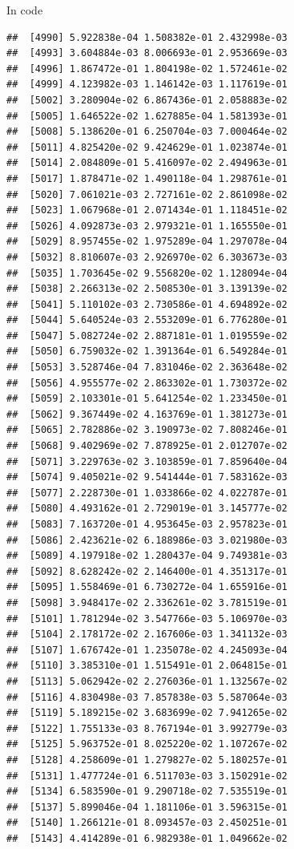 \documentclass[ignorenonframetext,]{beamer}
\begin{document}
\begin{frame}[fragile]{In code}
\begin{verbatim}
##  [4990] 5.922838e-04 1.508382e-01 2.432998e-03
##  [4993] 3.604884e-03 8.006693e-01 2.953669e-03
##  [4996] 1.867472e-01 1.804198e-02 1.572461e-02
##  [4999] 4.123982e-03 1.146142e-03 1.117619e-01
##  [5002] 3.280904e-02 6.867436e-01 2.058883e-02
##  [5005] 1.646522e-02 1.627885e-04 1.581393e-01
##  [5008] 5.138620e-01 6.250704e-03 7.000464e-02
##  [5011] 4.825420e-02 9.424629e-01 1.023874e-01
##  [5014] 2.084809e-01 5.416097e-02 2.494963e-01
##  [5017] 1.878471e-02 1.490118e-04 1.298761e-01
##  [5020] 7.061021e-03 2.727161e-02 2.861098e-02
##  [5023] 1.067968e-01 2.071434e-01 1.118451e-02
##  [5026] 4.092873e-03 2.979321e-01 1.165550e-01
##  [5029] 8.957455e-02 1.975289e-04 1.297078e-04
##  [5032] 8.810607e-03 2.926970e-02 6.303673e-03
##  [5035] 1.703645e-02 9.556820e-02 1.128094e-04
##  [5038] 2.266313e-02 2.508530e-01 3.139139e-02
##  [5041] 5.110102e-03 2.730586e-01 4.694892e-02
##  [5044] 5.640524e-03 2.553209e-01 6.776280e-01
##  [5047] 5.082724e-02 2.887181e-01 1.019559e-02
##  [5050] 6.759032e-02 1.391364e-01 6.549284e-01
##  [5053] 3.528746e-04 7.831046e-02 2.363648e-02
##  [5056] 4.955577e-02 2.863302e-01 1.730372e-02
##  [5059] 2.103301e-01 5.641254e-02 1.233450e-01
##  [5062] 9.367449e-02 4.163769e-01 1.381273e-01
##  [5065] 2.782886e-02 3.190973e-02 7.808246e-01
##  [5068] 9.402969e-02 7.878925e-01 2.012707e-02
##  [5071] 3.229763e-02 3.103859e-01 7.859640e-04
##  [5074] 9.405021e-02 9.541444e-01 7.583162e-03
##  [5077] 2.228730e-01 1.033866e-02 4.022787e-01
##  [5080] 4.493162e-01 2.729019e-01 3.145777e-02
##  [5083] 7.163720e-01 4.953645e-03 2.957823e-01
##  [5086] 2.423621e-02 6.188986e-03 3.021980e-03
##  [5089] 4.197918e-02 1.280437e-04 9.749381e-03
##  [5092] 8.628242e-02 2.146400e-01 4.351317e-01
##  [5095] 1.558469e-01 6.730272e-04 1.655916e-01
##  [5098] 3.948417e-02 2.336261e-02 3.781519e-01
##  [5101] 1.781294e-02 3.547766e-03 5.106970e-03
##  [5104] 2.178172e-02 2.167606e-03 1.341132e-03
##  [5107] 1.676742e-01 1.235078e-02 4.245093e-04
##  [5110] 3.385310e-01 1.515491e-01 2.064815e-01
##  [5113] 5.062942e-02 2.276036e-01 1.132567e-02
##  [5116] 4.830498e-03 7.857838e-03 5.587064e-03
##  [5119] 5.189215e-02 3.683699e-02 7.941265e-02
##  [5122] 1.755133e-03 8.767194e-01 3.992779e-03
##  [5125] 5.963752e-01 8.025220e-02 1.107267e-02
##  [5128] 4.258609e-01 1.279827e-02 5.180257e-01
##  [5131] 1.477724e-01 6.511703e-03 3.150291e-02
##  [5134] 6.583590e-01 9.290718e-02 7.535519e-01
##  [5137] 5.899046e-04 1.181106e-01 3.596315e-01
##  [5140] 1.266121e-01 8.093457e-03 2.450251e-01
##  [5143] 4.414289e-01 6.982938e-01 1.049662e-02

\end{verbatim}
\end{frame}
\end{document}
